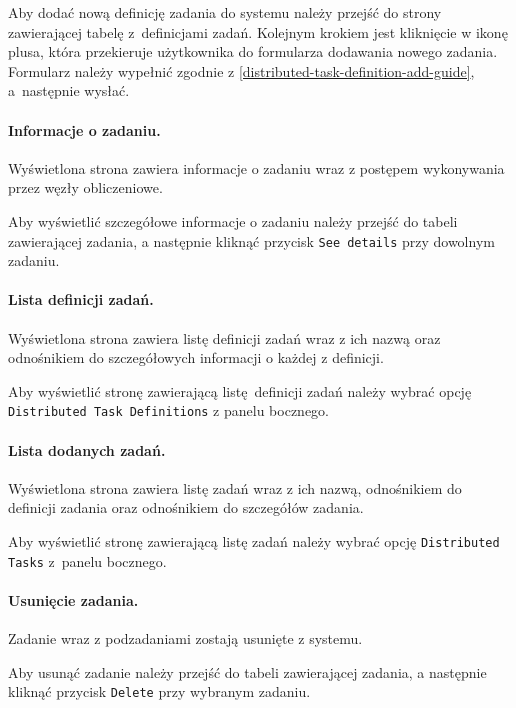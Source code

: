 \documentclass[a4paper,11pt,twoside]{report}
\theoremstyle{definition}
\begin{document}
                Aby dodać nową definicję zadania do systemu należy przejść do strony zawierającej tabelę z~definicjami zadań. Kolejnym krokiem jest kliknięcie w ikonę plusa, która przekieruje użytkownika do formularza dodawania nowego zadania. Formularz należy wypełnić zgodnie z \ref{distributed-task-definition-add-guide}, a~następnie wysłać.

            \paragraph{Informacje o zadaniu.}    
                \noindent Wyświetlona strona zawiera informacje o zadaniu wraz z postępem wykonywania przez węzły obliczeniowe. 
                
                Aby wyświetlić szczegółowe informacje o zadaniu należy przejść do tabeli zawierającej zadania, a następnie kliknąć przycisk \texttt{See details} przy dowolnym zadaniu.
                
            \paragraph{Lista definicji zadań.}  
                \noindent Wyświetlona strona zawiera listę definicji zadań wraz z ich nazwą oraz odnośnikiem do szczegółowych informacji o każdej z definicji.

                Aby wyświetlić stronę zawierającą listę definicji zadań należy wybrać opcję \texttt{Distributed Task Definitions} z panelu bocznego.

            \paragraph{Lista dodanych zadań.}   
                \noindent Wyświetlona strona zawiera listę zadań wraz z ich nazwą, odnośnikiem do definicji zadania oraz odnośnikiem do szczegółów zadania.
                
                Aby wyświetlić stronę zawierającą listę zadań należy wybrać opcję \texttt{Distributed Tasks} z~panelu bocznego.

            \paragraph{Usunięcie zadania.}  
                \noindent Zadanie wraz z podzadaniami zostają usunięte z systemu.
                
                Aby usunąć zadanie należy przejść do tabeli zawierającej zadania, a następnie kliknąć przycisk \texttt{Delete} przy wybranym zadaniu.
\end{document}
